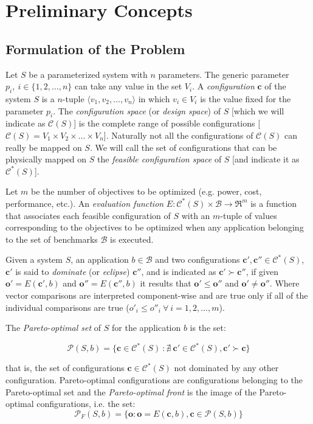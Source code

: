 
\section{Preliminary Concepts}

\subsection{Formulation of the Problem}

\label{sec:statement_of_the_problem}

Let $S$ be a parameterized system with $n$ parameters. The generic
parameter $p_i, \ i \in \{1,2,\ldots,n\}$ can take any value in
the set $V_i$. A {\em configuration} $\mathbf{c}$ of the system
$S$ is a $n$-tuple $\langle v_1,v_2,\ldots,v_n \rangle$ in which
$v_i \in V_i$ is the value fixed for the parameter $p_i$. The {\em
configuration space} (or {\em design space}) of $S$ [which we will
indicate as $\mathcal{C}(S)$] is the complete range of possible
configurations [$\mathcal{C}(S) = V_1 \times V_2 \times \ldots
\times V_n$]. Naturally not all the configurations of
$\mathcal{C}(S)$ can really be mapped on $S$. We will call the set
of configurations that can be physically mapped on $S$ the {\em
feasible configuration space} of $S$ [and indicate it as
$\mathcal{C}^*(S)$].

Let $m$ be the number of objectives to be optimized (e.g. power,
cost, performance, etc.). An {\em evaluation function}
$E:\mathcal{C}^*(S)\times \mathcal{B} \longrightarrow \Re^m$ is a
function that associates each feasible configuration of $S$ with
an $m$-tuple of values corresponding to the objectives to be
optimized when any application belonging to the set of benchmarks
$\mathcal{B}$ is executed.

Given a system $S$, an application $b \in \mathcal{B}$ and two
configurations $\mathbf{c}', \mathbf{c}'' \in \mathcal{C}^*(S)$,
$\mathbf{c}'$ is said to {\em dominate} (or {\em eclipse})
$\mathbf{c}''$, and is indicated as $\mathbf{c}' \succ
\mathbf{c}''$, if given $\mathbf{o}'=E(\mathbf{c}', b)$ and
$\mathbf{o}''=E(\mathbf{c}'', b)$ it results that $\mathbf{o}'
\leq \mathbf{o}''$ and $\mathbf{o}' \neq \mathbf{o}''$. Where
vector comparisons are interpreted component-wise and are true
only if all of the individual comparisons are true ($o'_i \leq
o''_i \ \forall \ i = 1,2,\ldots,m$).

The {\em Pareto-optimal set} of $S$ for the application $b$ is the
set:
\begin{defn}
\label{pers02.def:Pareto-set}
\[ \mathcal{P}(S,b) = \{ \mathbf{c} \in \mathcal{C}^*(S) \ : \nexists \ \mathbf{c}' \in \mathcal{C}^*(S), \mathbf{c}' \succ \mathbf{c} \} \]
\end{defn}
that is, the set of configurations $\mathbf{c} \in
\mathcal{C}^*(S)$ not dominated by any other configuration.
Pareto-optimal configurations are configurations belonging to the
Pareto-optimal set and the {\em Pareto-optimal front} is the image
of the Pareto-optimal configurations, i.e. the set:
\[ \mathcal{P}_{F}(S,b) = \{ \mathbf{o} : \mathbf{o} = E(\mathbf{c},b), \mathbf{c} \in \mathcal{P}(S,b) \} \]

